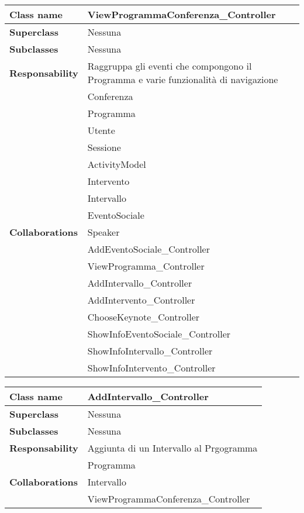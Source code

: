 \begin{table}[h!]
	\begin{tabular}{|l|l|}
		\hline 
		\textbf{Class name} & ViewProgrammaConferenza\_Controller
		\\ \hline
		\textbf{Superclass} & Nessuna
		\\ \hline
		\multirow{1}{*}{\textbf{Subclasses}} & Nessuna
		\\ \hline
		\textbf{Responsability} & Raggruppa gli eventi che compongono il Programma e varie funzionalità di navigazione
		\\ \hline
		\multirow{17}{*}{\textbf{Collaborations}} & Conferenza \\
		& Programma\\
		& Utente\\
		& Sessione\\
		& ActivityModel\\
		& Intervento \\
		& Intervallo \\
		& EventoSociale\\
		& Speaker\\
		& AddEventoSociale\_Controller\\
		& ViewProgramma\_Controller\\
		& AddIntervallo\_Controller\\
		& AddIntervento\_Controller\\
		& ChooseKeynote\_Controller\\
		& ShowInfoEventoSociale\_Controller\\
		& ShowInfoIntervallo\_Controller\\
		& ShowInfoIntervento\_Controller
		\\ \hline
	\end{tabular}
\end{table}

\newpage

\begin{table}[h!]
	\begin{tabular}{|l|l|}
		\hline 
		\textbf{Class name} & AddIntervallo\_Controller
		\\ \hline
		\textbf{Superclass} & Nessuna
		\\ \hline
		\multirow{1}{*}{\textbf{Subclasses}} & Nessuna
		\\ \hline
		\textbf{Responsability} & Aggiunta di un Intervallo al Prgogramma
		\\ \hline
		\multirow{3}{*}{\textbf{Collaborations}} & Programma \\
		& Intervallo\\
		& ViewProgrammaConferenza\_Controller
		\\ \hline
	\end{tabular}
\end{table}

